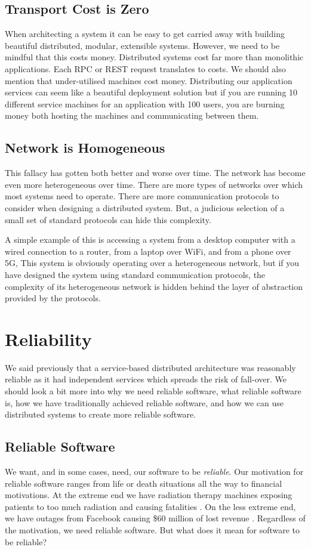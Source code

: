 \subsection{Transport Cost is Zero}
When architecting a system it can be easy to get carried away with building beautiful distributed, modular, extensible systems.
However, we need to be mindful that this costs money.
Distributed systems cost far more than monolithic applications.
Each RPC or REST request translates to costs.
We should also mention that under-utilised machines cost money.
Distributing our application services can seem like a beautiful deployment solution
but if you are running 10 different service machines for an application with 100 users,
you are burning money both hosting the machines and communicating between them.

\subsection{Network is Homogeneous}
This fallacy has gotten both better and worse over time.
The network has become even more heterogeneous over time.
There are more types of networks over which most systems need to operate.
There are more communication protocols to consider when designing a distributed system.
But, a judicious selection of a small set of standard protocols can hide this complexity.

A simple example of this is accessing a system from a desktop computer with a wired connection to a router,
from a laptop over WiFi, and from a phone over 5G,
This system is obviously operating over a heterogeneous network,
but if you have designed the system using standard communication protocols,
the complexity of its heterogeneous network is hidden behind the layer of abstraction provided by the protocols.


\section{Reliability}
We said previously that a service-based distributed architecture was reasonably reliable as it had independent services which spreads the risk of fall-over.
We should look a bit more into why we need reliable software,
what reliable software is,
how we have traditionally achieved reliable software,
and how we can use distributed systems to create more reliable software.

\subsection{Reliable Software}
We want, and in some cases, need, our software to be \textsl{reliable}.
Our motivation for reliable software ranges from life or death situations all the way to financial motivations.
At the extreme end we have radiation therapy machines exposing patients to too much radiation and causing fatalities \cite{therac}.
On the less extreme end,
we have outages from Facebook causing \$60 million of lost revenue \cite{facebook-outage}.
Regardless of the motivation,
we need reliable software.
But what does it mean for software to be reliable?

